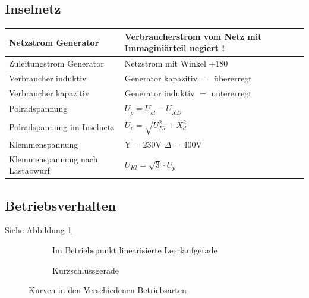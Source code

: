     \subsection{Inselnetz}
    \begin{tabular}{|p{7cm}|p{11cm}|}
    		\hline
        	Netzstrom Generator & Verbraucherstrom vom Netz mit Immaginiärteil negiert !\\  
        	\hline
        	Zuleitungstrom Generator & Netzstrom mit Winkel $+ 180$\textdegree \\
        	\hline
        	Verbraucher induktiv & Generator kapazitiv $=$ übererregt \\
        	Verbraucher kapazitiv & Generator induktiv $=$ untererregt \\
        	\hline
        	Polradspannung & $\underline{U}_p = \underline{U}_{kl} - \underline{U}_{XD} $ \\
        	\hline
        	Polradspannung im Inselnetz & $U_p=\sqrt{U_{Kl}^2+X_d^2} $\\
        	\hline
        	Klemmenspannung & Y = 230V $\Delta$ = 400V \\
        	\hline
        	Klemmenspannung nach Lastabwurf & $U_{Kl} = \sqrt{3} \cdot U_p $\\
        	\hline
    \end{tabular}

    \subsection{Betriebsverhalten}
    	Siehe Abbildung \ref{fig:betriebsverhalten}
    	\begin{figure}[h!]
	    	\centering
	    	\begin{subfigure}[t]{0.45\textwidth}
	    		\centering
	    		\caption{Im Betriebspunkt linearisierte Leerlaufgerade}
	    	\end{subfigure}
	    	\begin{subfigure}[t]{0.45\textwidth}
	    		\centering
	    		\caption{Kurzschlussgerade}
	        \end{subfigure}
	        \caption{Kurven in den Verschiedenen Betriebsarten}
	        \label{fig:betriebsverhalten}
    	\end{figure}
    	
